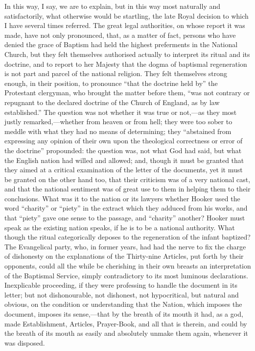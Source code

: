 In this way, I say, we are to explain, but in this way most
naturally and satisfactorily, what otherwise would be startling, the
late Royal decision to which I have several times referred. The great
legal authorities, on whose report it was made, have not only
pronounced, that, as a matter of fact, persons who have denied the
grace of Baptism had held the highest preferments in the National
Church, but they felt themselves authorised actually to interpret its
ritual and its doctrine, and to report to her Majesty that the dogma
of baptismal regeneration is not part and parcel of the national
religion. They felt themselves strong enough, in their position, to
pronounce ``that the doctrine held by'' the Protestant
clergyman, who brought the matter before them, ``was not contrary
or repugnant to the declared doctrine of the Church of England, as by
law established.'' The question was not whether it was true or
not,—as they most justly remarked,—whether from heaven or from
hell; they were too sober to meddle with what they had no means of
determining; they ``abstained from expressing any opinion of their
own upon the theological correctness or error of the doctrine''
propounded: the question was, not what God had said, but what the
English nation had willed and allowed; and, though it must be granted
that they aimed at a critical examination of the letter of the
documents, yet it must be granted on the other hand too, that their
criticism was of a very national cast, and that the national sentiment
was of great use to them in helping them to their conclusions. What
was it to the nation or its lawyers whether Hooker used the word
``charity'' or ``piety'' in the extract which they
adduced from his works, and that ``piety'' gave one sense to
the passage, and ``charity'' another? Hooker must speak as the
existing nation speaks, if he is to be a national authority. What
though the ritual categorically deposes to the regeneration of the
infant baptized? The Evangelical party, who, in former years, had had
the nerve to fix the charge of dishonesty on the explanations of the
Thirty-nine Articles, put forth by their opponents, could all the
while be cherishing in their own breasts an interpretation of the
Baptismal Service, simply contradictory to its most luminous
declarations. Inexplicable proceeding, if they were professing to
handle the document in its letter; but not dishonourable, not
dishonest, not hypocritical, but natural and obvious, on the condition
or understanding that the Nation, which imposes the document, imposes
its sense,—that by the breath of its mouth it had, as a god, made
Establishment, Articles, Prayer-Book, and all that is therein, and
could by the breath of its mouth as easily and absolutely unmake them
again, whenever it was disposed.

